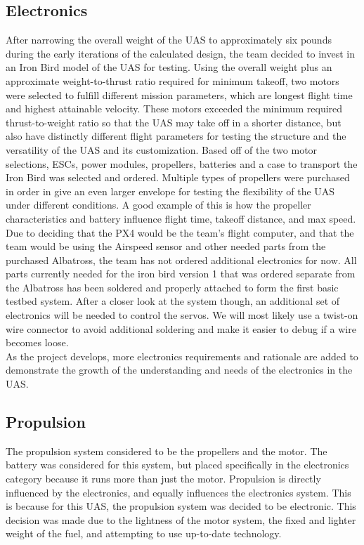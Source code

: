 ﻿\documentclass{article}
\begin{document}
\subsection{Electronics}
\noindent After narrowing the overall weight of the UAS to approximately six pounds during the early iterations of the calculated design, the team decided to invest in an Iron Bird model of the UAS for testing. Using the overall weight plus an approximate weight-to-thrust ratio required for minimum takeoff, two motors were selected to fulfill different mission parameters, which are longest flight time and highest attainable velocity. These motors exceeded the minimum required thrust-to-weight ratio so that the UAS may take off in a shorter distance, but also have distinctly different flight parameters for testing the structure and the versatility of the UAS and its customization. Based off of the two motor selections, ESCs, power modules, propellers, batteries and a case to transport the Iron Bird was selected and ordered. Multiple types of propellers were purchased in order in give an even larger envelope for testing the flexibility of the UAS under different conditions. A good example of this is how the propeller characteristics and battery influence flight time, takeoff distance, and max speed. \\

\noindent Due to deciding that the PX4 would be the team's flight computer, and that the team would be using the Airspeed sensor and other needed parts from the purchased Albatross, the team has not ordered additional electronics for now. All parts currently needed for the iron bird version 1 that was ordered separate from the Albatross has been soldered and properly attached to form the first basic testbed system. After a closer look at the system though, an additional set of electronics will be needed to control the servos. We will most likely use a twist-on wire connector to avoid additional soldering and make it easier to debug if a wire becomes loose. \\

\noindent As the project develops, more electronics requirements and rationale are added to demonstrate the growth of the understanding and needs of the electronics in the UAS. \\

\subsection{Propulsion}
\noindent The propulsion system considered to be the propellers and the motor. The battery was considered for this system, but placed specifically in the electronics category because it runs more than just the motor. Propulsion is directly influenced by the electronics, and equally influences the electronics system. This is because for this UAS, the propulsion system was decided to be electronic. This decision was made due to the lightness of the motor system, the fixed and lighter weight of the fuel, and attempting to use up-to-date technology. \\
\end{document}
